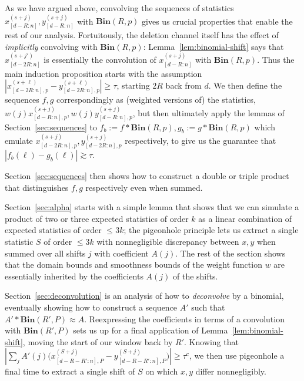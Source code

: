 \documentclass[11pt]{article}
\theoremstyle{plain}
\newcommand{\Bin}[2]{\textbf{Bin}(#1,#2)}
\begin{document}
\medskip{}

As we have argued above, convolving the sequences of statistics $x_{[d-R:n]}^{(s+j)},y_{[d-R:n]}^{(s+j)}$ with $\Bin{R}{p}$ gives us crucial properties that enable the rest of our analysis. Fortuitously, the deletion channel itself has the effect of \textit{implicitly} convolving with $\Bin{R}{p}$: Lemma~\ref{lem:binomial-shift} says that $x_{[d-2R:n]}^{(s+j')}$ is essentially the convolution of $x_{[d-R:n]}^{(s+j)}$ with $\Bin{R}{p}$. Thus the main induction proposition starts with the assumption $|x_{[d-2R:n],p}^{(s+\ell)}-y_{[d-2R:n],p}^{(s+\ell)}|\geq \tau$, starting $2R$ back from $d$. We then define the sequences $f,g$ correspondingly as (weighted versions of) the statistics, $w(j) x^{(s+j)}_{[d-R:n],p}, w(j) y^{(s+j)}_{[d-R:n],p}$, but then ultimately apply the lemmas of Section~\ref{sec:sequences} to $f_b:=f\ast \Bin{R}{p}, g_b:=g\ast \Bin{R}{p}$ which emulate $x_{[d-2R:n],p}^{(s+j)},y_{[d-2R:n],p}^{(s+j)}$ respectively, to give us the guarantee that $|f_b(\ell)-g_b(\ell)|\gtrsim \tau$.

Section~\ref{sec:sequences} then shows how to construct a double or triple product that distinguishes $f,g$ respectively even when summed.

Section~\ref{sec:alpha} starts with a simple lemma that shows that we can simulate a product of two or three expected statistics of order $k$ as a linear combination of expected statistics of order $\leq 3k$; the pigeonhole principle lets us extract a single statistic $S$ of order $\leq 3k$ with nonnegligible discrepancy between $x,y$ when summed over all shifts $j$ with coefficient $A(j)$. The rest of the section shows that the domain bounds and smoothness bounds of the weight function $w$ are essentially inherited by the coefficients $A(j)$ of the shifts.

Section~\ref{sec:deconvolution} is an analysis of how to \emph{deconvolve} by a binomial, eventually showing how to construct a sequence $A'$ such that $A'\ast \Bin{R'}{P}\approx A$. Reexpressing the coefficients in terms of a convolution with $\Bin{R'}{P}$ sets us up for a final application of Lemma~\ref{lem:binomial-shift}, moving the start of our window back by $R'$. Knowing that $\left|\sum_j A'(j) \big(x_{[d-R-R':n],P}^{(S+j)}-y_{[d-R-R':n],P}^{(S+j)}\big)\right|\geq \tau^c$, we then use pigeonhole a final time to extract a single shift of $S$ on which $x,y$ differ nonnegligibly.
\end{document}
